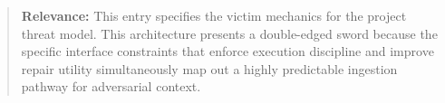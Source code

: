 \documentclass[11pt, a4paper]{article}
\begin{document}
\begin{quote}
\vspace{0.5em}
\textbf{Relevance:} This entry specifies the victim mechanics for the project threat model. This architecture presents a double-edged sword because the specific interface constraints that enforce execution discipline and improve repair utility simultaneously map out a highly predictable ingestion pathway for adversarial context.
\end{quote}
\end{document}
